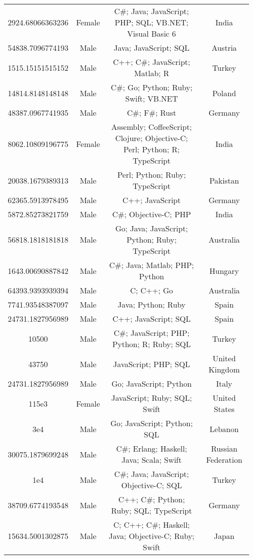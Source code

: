 \begin{center}
\begin{tabular}{ |c|c|c|c| }
2924.68066363236  &  Female  &  C\#; Java; JavaScript; PHP; SQL; VB.NET; Visual Basic 6  &  India  \\ 
54838.7096774193  &  Male  &  Java; JavaScript; SQL  &  Austria  \\ 
1515.15151515152  &  Male  &  C++; C\#; JavaScript; Matlab; R  &  Turkey  \\ 
14814.8148148148  &  Male  &  C\#; Go; Python; Ruby; Swift; VB.NET  &  Poland  \\ 
48387.0967741935  &  Male  &  C\#; F\#; Rust  &  Germany  \\ 
8062.10809196775  &  Female  &  Assembly; CoffeeScript; Clojure; Objective-C; Perl; Python; R; TypeScript  &  India  \\ 
20038.1679389313  &  Male  &  Perl; Python; Ruby; TypeScript  &  Pakistan  \\ 
62365.5913978495  &  Male  &  C++; JavaScript  &  Germany  \\ 
5872.85273821759  &  Male  &  C\#; Objective-C; PHP  &  India  \\ 
56818.1818181818  &  Male  &  Go; Java; JavaScript; Python; Ruby; TypeScript  &  Australia  \\ 
1643.00690887842  &  Male  &  C\#; Java; Matlab; PHP; Python  &  Hungary  \\ 
64393.9393939394  &  Male  &  C; C++; Go  &  Australia  \\ 
7741.93548387097  &  Male  &  Java; Python; Ruby  &  Spain  \\ 
24731.1827956989  &  Male  &  C++; JavaScript; SQL  &  Spain  \\ 
10500  &  Male  &  C\#; JavaScript; PHP; Python; R; Ruby; SQL  &  Turkey  \\ 
43750  &  Male  &  JavaScript; PHP; SQL  &  United Kingdom  \\ 
24731.1827956989  &  Male  &  Go; JavaScript; Python  &  Italy  \\ 
115e3  &  Female  &  JavaScript; Ruby; SQL; Swift  &  United States  \\ 
3e4  &  Male  &  Go; JavaScript; Python; SQL  &  Lebanon  \\ 
30075.1879699248  &  Male  &  C\#; Erlang; Haskell; Java; Scala; Swift  &  Russian Federation  \\ 
1e4  &  Male  &  C\#; Java; JavaScript; Objective-C; SQL  &  Turkey  \\ 
38709.6774193548  &  Male  &  C++; C\#; Python; Ruby; SQL; TypeScript  &  Germany  \\ 
15634.5001302875  &  Male  &  C; C++; C\#; Haskell; Java; Objective-C; Ruby; Swift  &  Japan  \\ 

\end{tabular}
\end{center}
